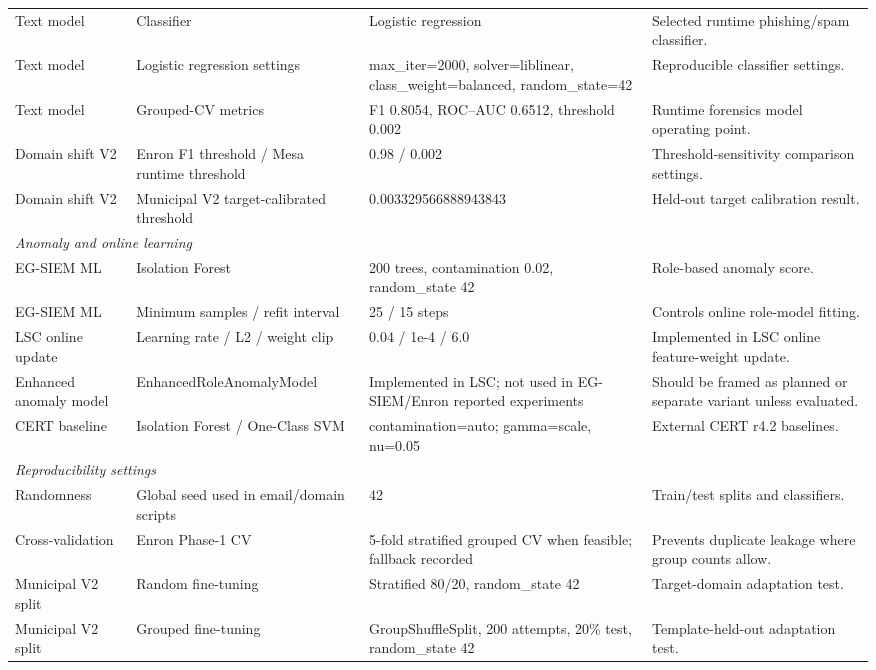 \begin{table}[t]
\begin{tabular}{llll}
Text model & Classifier & Logistic regression & Selected runtime phishing/spam classifier. \\
Text model & Logistic regression settings & max\_iter=2000, solver=liblinear, class\_weight=balanced, random\_state=42 & Reproducible classifier settings. \\
Text model & Grouped-CV metrics & F1 0.8054, ROC--AUC 0.6512, threshold 0.002 & Runtime forensics model operating point. \\
Domain shift V2 & Enron F1 threshold / Mesa runtime threshold & 0.98 / 0.002 & Threshold-sensitivity comparison settings. \\
Domain shift V2 & Municipal V2 target-calibrated threshold & 0.003329566888943843 & Held-out target calibration result. \\
\midrule
\multicolumn{4}{l}{\textit{Anomaly and online learning}} \\
EG-SIEM ML & Isolation Forest & 200 trees, contamination 0.02, random\_state 42 & Role-based anomaly score. \\
EG-SIEM ML & Minimum samples / refit interval & 25 / 15 steps & Controls online role-model fitting. \\
LSC online update & Learning rate / L2 / weight clip & 0.04 / 1e-4 / 6.0 & Implemented in LSC online feature-weight update. \\
Enhanced anomaly model & EnhancedRoleAnomalyModel & Implemented in LSC; not used in EG-SIEM/Enron reported experiments & Should be framed as planned or separate variant unless evaluated. \\
CERT baseline & Isolation Forest / One-Class SVM & contamination=auto; gamma=scale, nu=0.05 & External CERT r4.2 baselines. \\
\midrule
\multicolumn{4}{l}{\textit{Reproducibility settings}} \\
Randomness & Global seed used in email/domain scripts & 42 & Train/test splits and classifiers. \\
Cross-validation & Enron Phase-1 CV & 5-fold stratified grouped CV when feasible; fallback recorded & Prevents duplicate leakage where group counts allow. \\
Municipal V2 split & Random fine-tuning & Stratified 80/20, random\_state 42 & Target-domain adaptation test. \\
Municipal V2 split & Grouped fine-tuning & GroupShuffleSplit, 200 attempts, 20\% test, random\_state 42 & Template-held-out adaptation test. \\
\bottomrule
\end{tabular}
\end{table}
